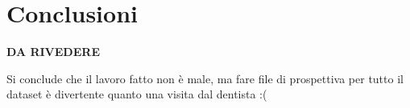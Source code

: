 \chapter{Conclusioni}
\label{sec:conclusioni}

\textbf{DA RIVEDERE}

Si conclude che il lavoro fatto non è male, ma fare file di prospettiva per tutto il dataset è divertente quanto una visita dal dentista :(

